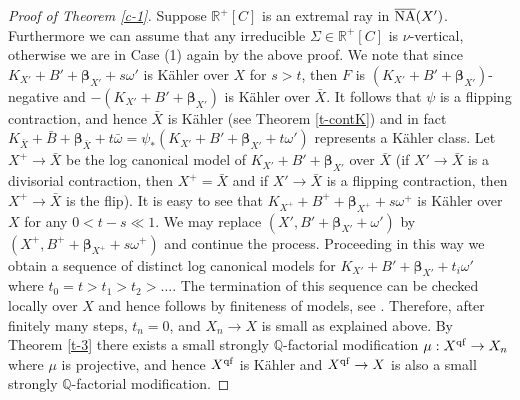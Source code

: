 \documentclass[11pt]{amsart}
\newcommand\Xieinline[1]{\todo[inline,color=green!40]{#1}} %
\numberwithin{equation}{section}
\def\bbeta{\boldsymbol{\beta}}
\newcommand\Q{{\mathbb{Q}}}
\newcommand\R{{\mathbb{R}}}
\theoremstyle{definition}
\theoremstyle{definition}
\theoremstyle{definition}
\begin{document}
\begin{proof}[Proof of Theorem \ref{c-1}]
Suppose $\R^+[C]$ is an extremal ray in $\overline {\rm NA}(X')$. Furthermore we can assume that any irreducible $\Sigma \in \R^+ [C]$ is $\nu$-vertical, otherwise we are in Case (1) again by the above proof.   %
 We note that since $K_{X'}+B'+\bbeta _{X'}+s\omega '$ is K\"ahler over $X$ for $s>t$, then $F$ is $(K_{X'}+B'+\bbeta _{X'})$-negative and $-(K_{X'}+B'+\bbeta _{X'})$ is K\"ahler over $\bar X$. 
 It follows that $\psi$ is a flipping contraction,  and hence $\bar X$ is K\"ahler (see Theorem \ref{t-contK}) and in fact $K_{\bar X}+\bar B+\bbeta _{\bar  X}+t\bar \omega =\psi _*(K_{X'}+B'+\bbeta _{X'}+t\omega ')$ represents a K\"ahler class.
 Let $X^+\to \bar X$ be the log canonical model of $K_{X'}+B'+\bbeta _{X'}$ over $\bar X$ (if $X'\to \bar X$ is a divisorial contraction, then $X^+=\bar X$ and if $X'\to \bar X$ is a flipping contraction, then $X^+\to \bar X$ is the flip). It is easy to see that $K_{X^+}+B^++\bbeta _{X^+}+s\omega ^+$ is K\"ahler over $X$ for any $0<t-s\ll 1$. We may replace $(X',B'+\bbeta _{X'}+\omega ')$ by $(X^+,B^++\bbeta _{X^+}+s\omega ^+)$ and continue the process. Proceeding in this way we obtain a sequence of distinct log canonical models for $K_{X'}+B'+\bbeta _{X'}+t_i\omega '$
 where $t_0=t>t_1>t_2>\ldots$.
 The termination of this sequence can be checked locally over $X$ and hence follows by finiteness of models, see \cite[Theorem E]{Fuj22}. Therefore, after finitely many steps, $t_n=0$,  and $X_n\to X$ is small as explained above.  By Theorem \ref{t-3} there exists a small strongly $\Q$-factorial modification $\mu: X^{\rm qf}\to X_n$ where $\mu$ is projective, and hence $X^{\rm qf}$ is K\"ahler and $X^{\rm qf}\to X$ is also a small strongly $\Q$-factorial modification.
 

\end{proof}
\end{document}
